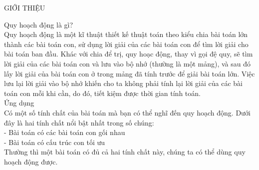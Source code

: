 \documentclass[10pt,a4paper]{article}
\begin{document}
\begin{center}
    \fontsize{30}{30}\selectfont
    GIỚI THIỆU \\
\end{center}

\begin{flushleft}
    \fontsize{14}{20}\selectfont
    Quy hoạch động là gì?\\
    Quy hoạch động là một kĩ thuật thiết kế thuật toán theo kiểu chia bài toán lớn thành các bài toán con, sử dụng lời giải của các bài toán con để tìm lời giải cho bài toán ban đầu. Khác với chia để trị, quy hoạc động, thay vì gọi đệ quy, sẽ tìm lời giải của các bài toán con và lưu vào bộ nhớ (thường là một mảng), và sau đó lấy lời giải của bài toán con ở trong mảng đã tính trước để giải bài toán lớn. Việc lưu lại lời giải vào bộ nhớ khiến cho ta không phải tính lại lời giải của các bài toán con mỗi khi cần, do đó, tiết kiệm được thời gian tính toán.\\
    \vspace{1 cm}
    Ứng dụng\\
    Có một số tính chất của bài toán mà bạn có thể nghĩ đến quy hoạch động. Dưới đây là hai tính chất nổi bật nhất trong số chúng:\\
    - Bài toán có các bài toán con gối nhau\\
    - Bài toán có cấu trúc con tối ưu\\
    Thường thì một bài toán có đủ cả hai tính chất này, chúng ta có thể dùng quy hoạch động được.\\
\end{flushleft}
\end{document}
